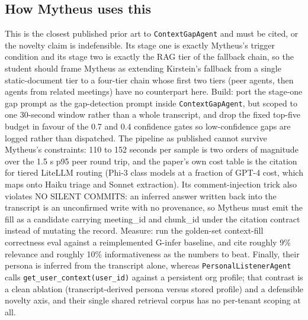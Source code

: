 \subsection{How Mytheus uses this}
\begin{takeaway}
This is the closest published prior art to \texttt{ContextGapAgent} and must be cited, or the novelty claim is indefensible. Its stage one is exactly Mytheus's trigger condition and its stage two is exactly the RAG tier of the fallback chain, so the student should frame Mytheus as extending Kirstein's fallback from a single static-document tier to a four-tier chain whose first two tiers (peer agents, then agents from related meetings) have no counterpart here. Build: port the stage-one gap prompt as the gap-detection prompt inside \texttt{ContextGapAgent}, but scoped to one 30-second window rather than a whole transcript, and drop the fixed top-five budget in favour of the 0.7 and 0.4 confidence gates so low-confidence gaps are logged rather than dispatched. The pipeline as published cannot survive Mytheus's constraints: 110 to 152 seconds per sample is two orders of magnitude over the 1.5 s p95 peer round trip, and the paper's own cost table is the citation for tiered LiteLLM routing (Phi-3 class models at a fraction of GPT-4 cost, which maps onto Haiku triage and Sonnet extraction). Its comment-injection trick also violates NO SILENT COMMITS: an inferred answer written back into the transcript is an unconfirmed write with no provenance, so Mytheus must emit the fill as a candidate carrying meeting\_id and chunk\_id under the citation contract instead of mutating the record. Measure: run the golden-set context-fill correctness eval against a reimplemented G-infer baseline, and cite roughly 9\% relevance and roughly 10\% informativeness as the numbers to beat. Finally, their persona is inferred from the transcript alone, whereas \texttt{PersonalListenerAgent} calls \texttt{get\_user\_context(user\_id)} against a persistent org profile; that contrast is a clean ablation (transcript-derived persona versus stored profile) and a defensible novelty axis, and their single shared retrieval corpus has no per-tenant scoping at all.
\end{takeaway}

